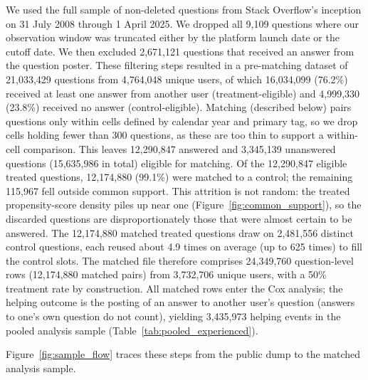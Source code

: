 We used the full sample of non-deleted questions from Stack Overflow's inception on 31 July 2008 through 1 April 2025. We dropped all 9,109 questions where our observation window was truncated either by the platform launch date or the cutoff date. We then excluded 2,671,121 questions that received an answer from the question poster.
These filtering steps resulted in a pre-matching dataset of 21,033,429 questions from 4,764,048 unique users, of which 16,034,099 (76.2\%) received at least one answer from another user (treatment-eligible) and 4,999,330 (23.8\%) received no answer (control-eligible). Matching (described below) pairs questions only within cells defined by calendar year and primary tag, so we drop cells holding fewer than 300 questions, as these are too thin to support a within-cell comparison. This leaves 12,290,847 answered and 3,345,139 unanswered questions (15,635,986 in total) eligible for matching. Of the 12,290,847 eligible treated questions, 12,174,880 (99.1\%) were matched to a control; the remaining 115,967 fell outside common support. This attrition is not random: the treated propensity-score density piles up near one (Figure~\ref{fig:common_support}), so the discarded questions are disproportionately those that were almost certain to be answered. The 12,174,880 matched treated questions draw on 2,481,556 distinct control questions, each reused about 4.9 times on average (up to 625 times) to fill the control slots. The matched file therefore comprises 24,349,760 question-level rows (12,174,880 matched pairs) from 3,732,706 unique users, with a 50\% treatment rate by construction. All matched rows enter the Cox analysis; the helping outcome is the posting of an answer to another user's question (answers to one's own question do not count), yielding 3,435,973 helping events in the pooled analysis sample (Table~\ref{tab:pooled_experienced}).

Figure~\ref{fig:sample_flow} traces these steps from the public dump to the matched analysis sample.

